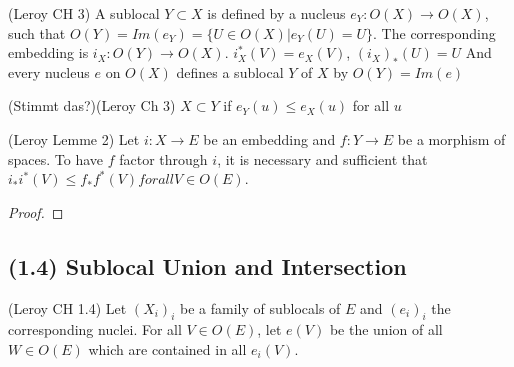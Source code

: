 \begin{definition}[Sublocal]
(Leroy CH 3)
    \label{def:sublocal}
    \leanok
    A sublocal $Y \subset X$ is defined by a nucleus $e_Y: O(X) \rightarrow O(X)$, such that $O(Y) = Im(e_Y) = \{U \in O(X) | e_Y(U) = U\}$.
    The corresponding embedding is $i_X : O(Y) \rightarrow O(X)$. $i^*_X(V) = e_X(V)$, $(i_X)_*(U) = U$
    And every nucleus $e$ on $O(X)$ defines a sublocal $Y$ of $X$ by $O(Y) = Im(e)$
\end{definition}

\begin{definition}
(Stimmt das?)(Leroy Ch 3)
    \label{def:sublocal_inclusion}
    \leanok
    $X \subset Y$ if $e_Y(u) \le e_X(u)$ for all $u$
\end{definition}

\begin{lemma}[factorisation]
(Leroy Lemme 2)
    \label{lem:factorisation}
    \leanok
    Let $i : X \rightarrow E$ be an embedding and $f: Y \rightarrow E$ be a morphism of spaces. To have $f$ factor through $i$, it is necessary and sufficient that $i_*i^*(V) \le f_*f^*(V) for all V \in O(E)$.
\end{lemma}
\begin{proof}
    \leanok
\end{proof}

\subsection{(1.4) Sublocal Union and Intersection}

\begin{definition}
(Leroy CH 1.4)
    \label{def:sublocal_union}
    \leanok
    Let $(X_i)_i$ be a family of sublocals of $E$ and $(e_i)_i$ the corresponding nuclei.
    For all $V \in O(E)$, let $e(V)$ be the union of all $W \in O(E)$ which are contained in all $e_i(V)$.
\end{definition}

